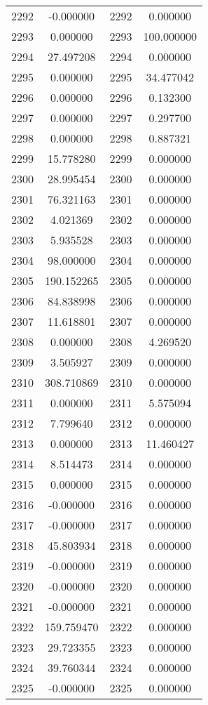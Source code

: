 \documentclass[12pt]{article}
\begin{document}
\begin{longtable}{@{}cccc@{}}
2292 & -0.000000 & 2292 & 0.000000 \\
2293 & 0.000000 & 2293 & 100.000000 \\
2294 & 27.497208 & 2294 & 0.000000 \\
2295 & 0.000000 & 2295 & 34.477042 \\
2296 & 0.000000 & 2296 & 0.132300 \\
2297 & 0.000000 & 2297 & 0.297700 \\
2298 & 0.000000 & 2298 & 0.887321 \\
2299 & 15.778280 & 2299 & 0.000000 \\
2300 & 28.995454 & 2300 & 0.000000 \\
2301 & 76.321163 & 2301 & 0.000000 \\
2302 & 4.021369 & 2302 & 0.000000 \\
2303 & 5.935528 & 2303 & 0.000000 \\
2304 & 98.000000 & 2304 & 0.000000 \\
2305 & 190.152265 & 2305 & 0.000000 \\
2306 & 84.838998 & 2306 & 0.000000 \\
2307 & 11.618801 & 2307 & 0.000000 \\
2308 & 0.000000 & 2308 & 4.269520 \\
2309 & 3.505927 & 2309 & 0.000000 \\
2310 & 308.710869 & 2310 & 0.000000 \\
2311 & 0.000000 & 2311 & 5.575094 \\
2312 & 7.799640 & 2312 & 0.000000 \\
2313 & 0.000000 & 2313 & 11.460427 \\
2314 & 8.514473 & 2314 & 0.000000 \\
2315 & 0.000000 & 2315 & 0.000000 \\
2316 & -0.000000 & 2316 & 0.000000 \\
2317 & -0.000000 & 2317 & 0.000000 \\
2318 & 45.803934 & 2318 & 0.000000 \\
2319 & -0.000000 & 2319 & 0.000000 \\
2320 & -0.000000 & 2320 & 0.000000 \\
2321 & -0.000000 & 2321 & 0.000000 \\
2322 & 159.759470 & 2322 & 0.000000 \\
2323 & 29.723355 & 2323 & 0.000000 \\
2324 & 39.760344 & 2324 & 0.000000 \\
2325 & -0.000000 & 2325 & 0.000000 \\

\end{longtable}
\end{document}
